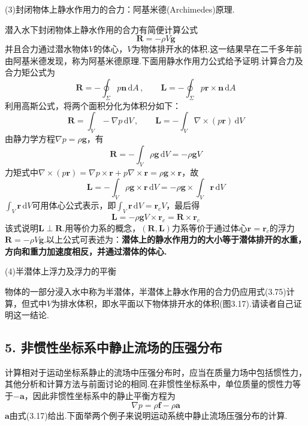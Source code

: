 (3)封闭物体上静水作用力的合力：阿基米德(Archimedes)原理.

潜入水下封闭物体上静水作用的合力有简便计算公式
\begin{equation*}
\boldsymbol{R}=-\rho V\boldsymbol{g}
\tag{3.75}
\end{equation*}
并且合力通过潜水物体$V$的体心，$V$为物体排开水的体积.这一结果早在二千多年前由阿基米德发现，称为阿基米德原理.下面用静水作用力公式给予证明.计算合力及合力矩公式为
\[
\boldsymbol{R}=-\oint_\Sigma p\boldsymbol{n}\,\mathrm{d}A\,,\qquad \boldsymbol{L}=-\oint_\Sigma p\boldsymbol{r}\times\boldsymbol{n}\,\mathrm{d}A
\]
利用高斯公式，将两个面积分化为体积分如下：
\[
\boldsymbol{R}=\int_V -\nabla p\,\mathrm{d}V\,,\qquad \boldsymbol{L}=-\int_V \nabla\times(p\boldsymbol{r})\,\mathrm{d}V
\]
由静力学方程$\nabla p=\rho\boldsymbol{g}$，有
\[
\boldsymbol{R}=-\int_V \rho\boldsymbol{g}\,\mathrm{d}V=-\rho\boldsymbol{g}V
\]
力矩式中$\nabla\times(p\boldsymbol{r})=\nabla p\times\boldsymbol{r}+p\nabla\times\boldsymbol{r}=\rho\boldsymbol{g}\times\boldsymbol{r}$，故
\[
\boldsymbol{L}=-\int_V \rho\boldsymbol{g}\times\boldsymbol{r}\,\mathrm{d}V=-\rho\boldsymbol{g}\times\int_V \boldsymbol{r}\,\mathrm{d}V
\]
$\displaystyle\int_V \boldsymbol{r}\,\mathrm{d}V$可用体心公式表示，即$\displaystyle\int_V \boldsymbol{r}\,\mathrm{d}V=\boldsymbol{r}_c V$，最后得
\[
\boldsymbol{L}=-\rho\boldsymbol{g}V\times\boldsymbol{r}_c=\boldsymbol{R}\times\boldsymbol{r}_c
\]
该式说明$\boldsymbol{L}\perp\boldsymbol{R}$.用等价力系的概念，$(\boldsymbol{R},\boldsymbol{L})$力系等价于通过体心$\boldsymbol{r}=\boldsymbol{r}_c$的浮力$\boldsymbol{R}=-\rho V\boldsymbol{g}$.以上公式可表述为：\textbf{潜体上的静水作用力的大小等于潜体排开的水重，方向和重力加速度相反，并通过潜体的体心.}

(4)半潜体上浮力及浮力的平衡

物体的一部分浸入水中称为半潜体，半潜体上静水作用的合力仍应用式(3.75)计算，但式中$V$为排水体积，即水平面以下物体排开水的体积(图3.17).请读者自己证明这一结论.

\subsection*{5. 非惯性坐标系中静止流场的压强分布}

计算相对于运动坐标系静止的流场中压强分布时，应当在质量力场中包括惯性力，其他分析和计算方法与前面讨论的相同.在非惯性坐标系中，单位质量的惯性力等于$-\boldsymbol{a}$，因此非惯性坐标系中的静止平衡方程为
\begin{equation*}
\nabla p=\rho\boldsymbol{f}-\rho\boldsymbol{a}
\tag{3.76}
\end{equation*}
$\boldsymbol{a}$由式(3.17)给出.下面举两个例子来说明运动系统中静止流场压强分布的计算.

